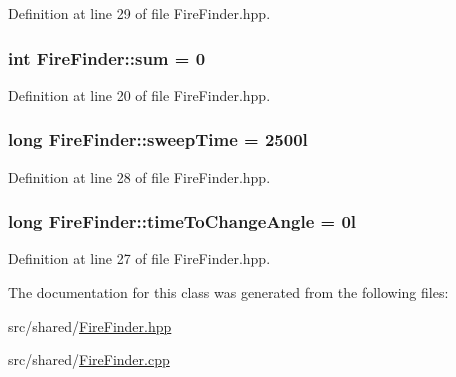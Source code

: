 Definition at line 29 of file Fire\-Finder.\-hpp.

\hypertarget{classFireFinder_a84926ae7c01b8c03bb87c810136a41ff}{
\subsubsection[{sum}]{\setlength{\rightskip}{0pt plus 5cm}int Fire\-Finder\-::sum = 0\hspace{0.3cm}{\ttfamily [private]}}}\label{classFireFinder_a84926ae7c01b8c03bb87c810136a41ff}


Definition at line 20 of file Fire\-Finder.\-hpp.

\hypertarget{classFireFinder_aaa38192d82bc4120129b72fee61f72f1}{
\subsubsection[{sweep\-Time}]{\setlength{\rightskip}{0pt plus 5cm}long Fire\-Finder\-::sweep\-Time = 2500l\hspace{0.3cm}{\ttfamily [private]}}}\label{classFireFinder_aaa38192d82bc4120129b72fee61f72f1}


Definition at line 28 of file Fire\-Finder.\-hpp.

\hypertarget{classFireFinder_a97b1a598ddb7886feb4a96a4931cc103}{
\subsubsection[{time\-To\-Change\-Angle}]{\setlength{\rightskip}{0pt plus 5cm}long Fire\-Finder\-::time\-To\-Change\-Angle = 0l\hspace{0.3cm}{\ttfamily [private]}}}\label{classFireFinder_a97b1a598ddb7886feb4a96a4931cc103}


Definition at line 27 of file Fire\-Finder.\-hpp.



The documentation for this class was generated from the following files\-:\begin{DoxyCompactItemize}
\item 
src/shared/\hyperlink{FireFinder_8hpp}{Fire\-Finder.\-hpp}\item 
src/shared/\hyperlink{FireFinder_8cpp}{Fire\-Finder.\-cpp}\end{DoxyCompactItemize}
